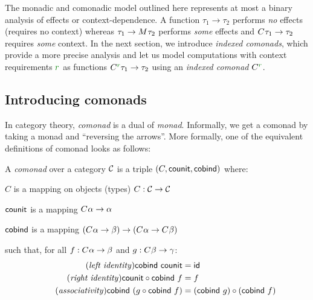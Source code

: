 The monadic and comonadic model outlined here represents at most a binary analysis of effects or 
context-dependence. A function $\tau_1 \rightarrow \tau_2$ performs \emph{no} effects (requires no 
context) whereas $\tau_1 \rightarrow M^{}\tau_2$ performs \emph{some} effects and
$C^{}\tau_1 \rightarrow \tau_2$ requires \emph{some} context. In the next section, we introduce
\emph{indexed comonads}, which provide a more precise analysis and let us model computations with
context requirements $\cclrd{r}$ as functions $\ctyp{\cclrd{r}}{\tau_1} \rightarrow \tau_2$ using
an \emph{indexed comonad} $\ctyp{\cclrd{r}}{}$.


\subsection{Introducing comonads}

In category theory, \emph{comonad} is a dual of \emph{monad}. Informally, we get a comonad by 
taking a monad and ``reversing the arrows''. More formally, one of the equivalent definitions of
comonad looks as follows:

\begin{definition}
A \emph{comonad} over a category $\mathcal{C}$ is a triple $(C, \textnormal{\sffamily counit}, \textnormal{\sffamily cobind})$ where:
\begin{compactitem}
\item $C$ is a mapping on objects (types) $C : \mathcal{C} \rightarrow \mathcal{C}$
\item $\textnormal{\sffamily counit}$ is a mapping $C^{}\alpha \rightarrow \alpha$ 
\item $\textnormal{\sffamily cobind}$ is a mapping $(C^{}\alpha \rightarrow \beta) 
  \rightarrow (C^{}\alpha \rightarrow C^{}\beta)$
\end{compactitem}
such that, for all $f:C^{}\alpha \rightarrow \beta$ and $g:C^{}\beta \rightarrow \gamma$:
\begin{align}
\tag{\emph{left identity}}
  \ident{cobind}~\ident{counit} &= \idf{}
  \\
\tag{\emph{right identity}}
  \ident{counit} \circ \ident{cobind}~f &= f
  \\
\tag{\emph{associativity}}
  \ident{cobind}~(g \circ \ident{cobind}~f) &= (\ident{cobind}~g) \circ (\ident{cobind}~f)
\end{align}
\end{definition}

